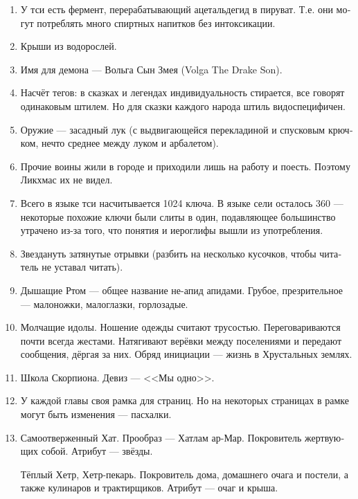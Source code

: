\documentclass[a4paper,12pt,fleqn]{book}\usepackage{polyglossia}\setdefaultlanguage[babelshorthands=true]{russian}\setotherlanguage{english}\defaultfontfeatures{Ligatures=TeX,Mapping=tex-text}\usepackage{xcolor}\newcommand{\ml}[3]{#2}
\begin{document}
{\begin{enumerate}
\item У тси есть фермент, перерабатывающий ацетальдегид в пируват.
Т.е. они могут потреблять много спиртных напитков без интоксикации.

\item Крыши из водорослей.

\item Имя для демона --- Вольга Сын Змея (Volga The Drake Son).

\item Насчёт тегов: в сказках и легендах индивидуальность стирается, все говорят одинаковым штилем.
Но для сказки каждого народа штиль видоспецифичен.

\item Оружие --- засадный лук (с выдвигающейся перекладиной и спусковым крючком, нечто среднее между луком и арбалетом).

\item Прочие воины жили в городе и приходили лишь на работу и поесть.
Поэтому Ликхмас их не видел.

\item Всего в языке тси насчитывается 1024 ключа.
В языке сели осталось 360 --- некоторые похожие ключи были слиты в один, подавляющее большинство утрачено из-за того, что понятия и иероглифы вышли из употребления.

\item Звездануть затянутые отрывки (разбить на несколько кусочков, чтобы читатель не уставал читать).

\item Дышащие Ртом --- общее название не-апид апидами.
Грубое, презрительное --- малоножки, малоглазки, горлозадые.

\item Молчащие идолы.
Ношение одежды считают трусостью.
Переговариваются почти всегда жестами.
Натягивают верёвки между поселениями и передают сообщения, дёргая за них.
Обряд инициации --- жизнь в Хрустальных землях.

\item Школа Скорпиона.
Девиз --- <<Мы одно>>.


\item У каждой главы своя рамка для страниц.
Но на некоторых страницах в рамке могут быть изменения --- пасхалки.

\item Самоотверженный Хат.
Прообраз --- Хатлам ар-Мар.
Покровитель жертвующих собой.
Атрибут --- звёзды.

Тёплый Хетр, Хетр-пекарь.
Покровитель дома, домашнего очага и постели, а также кулинаров и трактирщиков.
Атрибут --- очаг и крыша.


\end{enumerate}}
\end{document}
